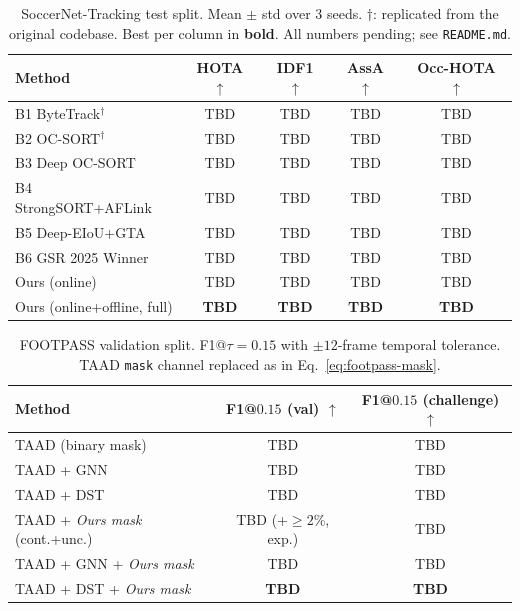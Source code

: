 \documentclass[conference]{IEEEtran}
\begin{document}
\begin{table}[t]
\centering
\caption{SoccerNet-Tracking test split. Mean $\pm$ std over 3 seeds. $\dagger$: replicated from the original codebase. Best per column in \textbf{bold}. All numbers pending; see \texttt{README.md}.}
\label{tab:main-track}
\small
\begin{tabular}{lcccc}
\toprule
Method & HOTA $\uparrow$ & IDF1 $\uparrow$ & AssA $\uparrow$ & Occ-HOTA $\uparrow$ \\
\midrule
B1 ByteTrack$^\dagger$ \cite{bytetrack}             & TBD & TBD & TBD & TBD \\
B2 OC-SORT$^\dagger$ \cite{ocsort}                  & TBD & TBD & TBD & TBD \\
B3 Deep OC-SORT \cite{deepocsort}                   & TBD & TBD & TBD & TBD \\
B4 StrongSORT+AFLink \cite{strongsort}              & TBD & TBD & TBD & TBD \\
B5 Deep-EIoU+GTA \cite{deepeiou, gtatrack}          & TBD & TBD & TBD & TBD \\
B6 GSR 2025 Winner \cite{gsr2025winner}             & TBD & TBD & TBD & TBD \\
\midrule
Ours (online)                                        & TBD & TBD & TBD & TBD \\
Ours (online+offline, full)                          & \textbf{TBD} & \textbf{TBD} & \textbf{TBD} & \textbf{TBD} \\
\bottomrule
\end{tabular}
\end{table}

\begin{table}[t]
\centering
\caption{FOOTPASS validation split. F1@$\tau=0.15$ with $\pm 12$-frame temporal tolerance. TAAD \texttt{mask} channel replaced as in Eq.~\ref{eq:footpass-mask}.}
\label{tab:main-footpass}
\small
\begin{tabular}{lcc}
\toprule
Method & F1@$0.15$ (val) $\uparrow$ & F1@$0.15$ (challenge) $\uparrow$ \\
\midrule
TAAD (binary mask) \cite{footpass}                          & TBD             & TBD \\
TAAD + GNN \cite{footpass}                                  & TBD             & TBD \\
TAAD + DST \cite{footpass}                                  & TBD             & TBD \\
\midrule
TAAD + \emph{Ours mask} (cont.+unc.)                         & TBD (+$\geq\!2$\%, exp.) & TBD \\
TAAD + GNN + \emph{Ours mask}                                & TBD             & TBD \\
TAAD + DST + \emph{Ours mask}                                & \textbf{TBD}    & \textbf{TBD} \\
\bottomrule
\end{tabular}
\end{table}
\end{document}
